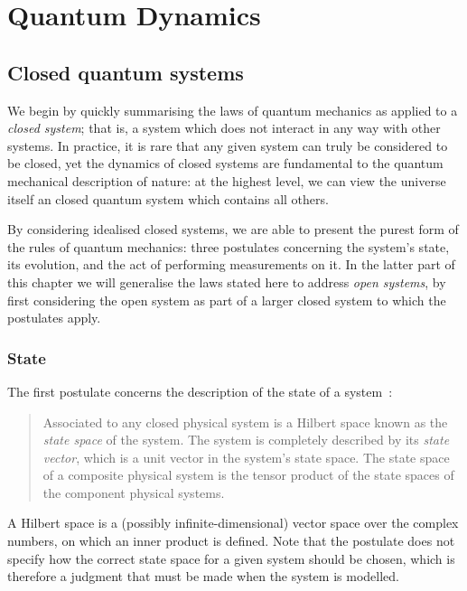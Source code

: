 \chapter{Quantum Dynamics} 
\label{ch:QuantumDynamics}

\section{Closed quantum systems}

We begin by quickly summarising the laws of quantum mechanics as applied to a \textit{closed system}; that is, a system which does not interact in any way with other systems. In practice, it is rare that any given system can truly be considered to be closed, yet the dynamics of closed systems are fundamental to the quantum mechanical description of nature: at the highest level, we can view the universe itself an closed quantum system which contains all others.

By considering idealised closed systems, we are able to present the purest form of the rules of quantum mechanics: three postulates concerning the system's state, its evolution, and the act of performing measurements on it. In the latter part of this chapter we will generalise the laws stated here to address \textit{open systems}, by first considering the open system as part of a larger closed system to which the postulates apply.

\subsection{State}

The first postulate concerns the description of the state of a system~\cite{nielsen+chuang}:
\begin{quotation}
  Associated to any closed physical system is a Hilbert space known as the \textit{state space} of the system. The system is completely described by its \textit{state vector}, which is a unit vector in the system's state space. The state space of a composite physical system is the tensor product of the state spaces of the component physical systems.
\end{quotation}
A Hilbert space is a (possibly infinite-dimensional) vector space over the complex numbers, on which an inner product is defined. Note that the postulate does not specify how the correct state space for a given system should be chosen, which is therefore a judgment that must be made when the system is modelled.

